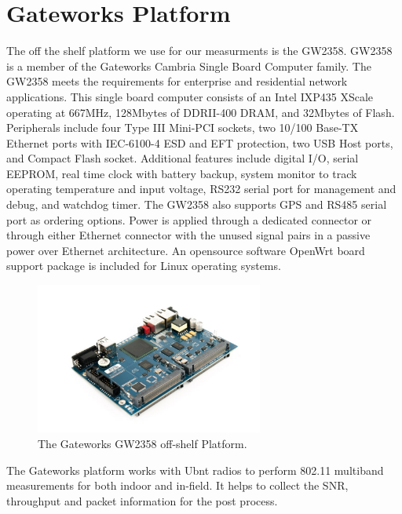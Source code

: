\section{Gateworks Platform}

The off the shelf platform we use for our measurments is the GW2358. 
GW2358 is a member of the Gateworks Cambria Single Board Computer family. 
The GW2358 meets the requirements for enterprise and residential network 
applications. This single board computer consists of an Intel IXP435 XScale 
operating at 667MHz, 128Mbytes of DDRII-400 DRAM, and 32Mbytes of Flash. 
Peripherals include four Type III Mini-PCI sockets, two 10/100 Base-TX 
Ethernet ports with IEC-6100-4 ESD and EFT protection, two USB Host ports, 
and Compact Flash socket. Additional features include digital I/O, serial 
EEPROM, real time clock with battery backup, system monitor to track 
operating temperature and input voltage, RS232 serial port for management 
and debug, and watchdog timer. The GW2358 also supports GPS and RS485 
serial port as ordering options. Power is applied through a dedicated 
connector or through either Ethernet connector with the unused signal 
pairs in a passive power over Ethernet architecture. 
An opensource software OpenWrt board support package is included 
for Linux operating systems.


\begin{figure} 
\centering
\includegraphics[width=75mm]{figures/gw2358}
\vspace{-0.1in}
\caption{The Gateworks GW2358 off-shelf Platform.}
\label{fig:gw2358}
\vspace{0.1in}
\end{figure}



The Gateworks platform works with Ubnt radios to perform 802.11 
multiband measurements for both indoor and in-field. It helps to 
collect the SNR, throughput and packet information for the post 
process. 

